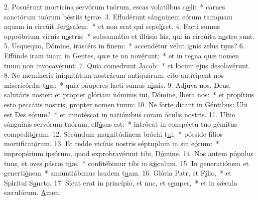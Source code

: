 2. Posuérunt morticína servórum tuórum, escas volatílbus c\uline{æ}li:~* carnes sanctórum tuórum béstiis t\uline{e}rræ.
3. Effudérunt sánguinem eórum tamquam aquam in circúit Jer\uline{ú}salem:~* et non erat qui sepel\uline{í}ret.
4. Facti sumus oppróbrium vicnis n\uline{o}stris:~* subsannátio et illúsio his, qui in circúitu n\uline{o}stro sunt.
5. Usquequo, Dómine, irascérs in f\uline{i}nem:~* accendétur velut ignis zelus t\uline{u}us?
6. Effúnde iram tuam in Gentes, quæ te nn nov\uline{é}runt:~* et in regna quæ nomen tuum non invocav\uline{é}runt:
7. Quia comedrunt J\uline{a}cob:~* et locum ejus desolav\uline{é}runt.
8. Ne memíneris iniquitátum nostrárum antiquárum, cito antícipent nos misericórdæ t\uline{u}æ:~* quia páuperes facti sumus n\uline{i}mis.
9. Adjuva nos, Deus, salutáris noster: et propter glóriam nóminis tui, Dómine, lber\uline{a} nos:~* et propítius esto peccátis nostris, propter nomen t\uline{u}um:
10. Ne forte dicant in Géntibus: Ubi est Des e\uline{ó}rum?~* et innotéscat in natiónibus coram óculis n\uline{o}stris.
11. Ultio sánguinis servórum tuórum,  eff\uline{ú}sus est:~* intróeat in conspéctu tuo gémitus compedit\uline{ó}rum.
12. Secúndum magnitúdinem bráchi t\uline{u}i,~* pósside fílios mortificat\uline{ó}rum.
13. Et redde vicínis nostris séptuplum in sin e\uline{ó}rum:~* impropérium ipsórum, quod exprobravérunt tibi, D\uline{ó}mine.
14. Nos autem pópulus tuus, et oves páscæ t\uline{u}æ,~* confitébimur tibi in s\uline{ǽ}culum.
15. In generatiónem et generti\uline{ó}nem~* annuntiábimus laudem t\uline{u}am.
16. Glória Patr, et F\uline{í}lio,~* et Spirítui S\uline{a}ncto.
17. Sicut erat in princípio, et nnc, et s\uline{e}mper,~* et in sǽcula sæculórum. \uline{A}men.
